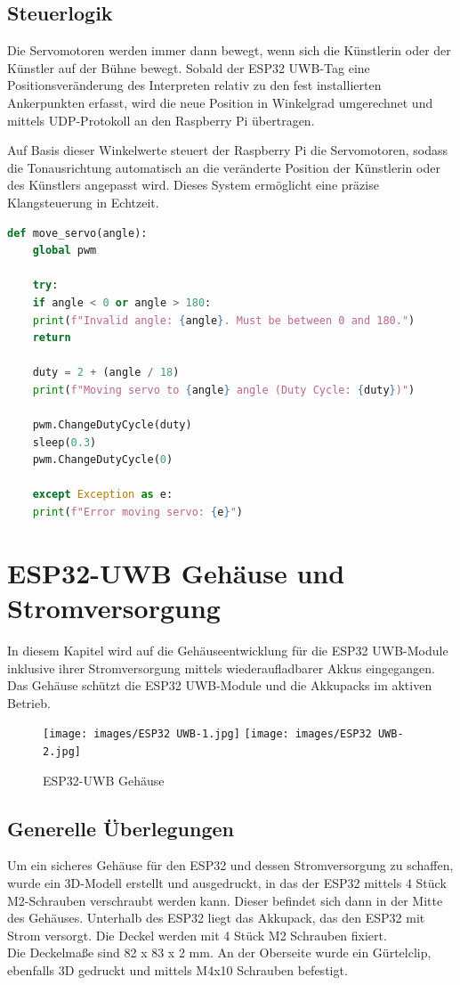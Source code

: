 \newpage
\subsection{Steuerlogik} \label{Steuerlogik}
Die Servomotoren werden immer dann bewegt, wenn sich die Künstlerin oder der Künstler auf der Bühne bewegt. Sobald der ESP32 UWB-Tag eine Positionsveränderung des Interpreten relativ zu den fest installierten Ankerpunkten erfasst, wird die neue Position in Winkelgrad umgerechnet und mittels UDP-Protokoll an den Raspberry Pi übertragen.  

Auf Basis dieser Winkelwerte steuert der Raspberry Pi die Servomotoren, sodass die Tonausrichtung automatisch an die veränderte Position der Künstlerin oder des Künstlers angepasst wird. Dieses System ermöglicht eine präzise Klangsteuerung in Echtzeit.

\begin{lstlisting}[language=Python]
	def move_servo(angle):
	global pwm
	
	try:
	if angle < 0 or angle > 180:
	print(f"Invalid angle: {angle}. Must be between 0 and 180.")
	return
	
	duty = 2 + (angle / 18)
	print(f"Moving servo to {angle} angle (Duty Cycle: {duty})")
	
	pwm.ChangeDutyCycle(duty)
	sleep(0.3)
	pwm.ChangeDutyCycle(0)
	
	except Exception as e:
	print(f"Error moving servo: {e}")
\end{lstlisting}

\newpage
\section{ESP32-UWB Gehäuse und Stromversorgung}
In diesem Kapitel wird auf die Gehäuseentwicklung für die ESP32 UWB-Module inklusive ihrer Stromversorgung mittels wiederaufladbarer Akkus eingegangen. Das Gehäuse schützt die ESP32 UWB-Module und die Akkupacks im aktiven Betrieb.

\begin{figure}[H]
	\centering
	\texttt{[image: images/ESP32 UWB-1.jpg]}
	\texttt{[image: images/ESP32 UWB-2.jpg]}
	\caption[ESP32-UWB Gehäuse]{ESP32-UWB Gehäuse}
	\label{fig:ESP32-UWB Gehäuse V2}
\end{figure}

\subsection{Generelle Überlegungen}
Um ein sicheres Gehäuse für den ESP32 und dessen Stromversorgung zu schaffen, wurde ein 3D-Modell erstellt und ausgedruckt, in das der ESP32 mittels 4 Stück M2-Schrauben verschraubt werden kann. Dieser befindet sich dann in der Mitte des Gehäuses. Unterhalb des ESP32 liegt das Akkupack, das den ESP32 mit Strom versorgt.
Die Deckel werden mit 4 Stück M2 Schrauben fixiert. \\
Die Deckelmaße sind 82 x 83 x 2 mm. An der Oberseite wurde ein Gürtelclip, ebenfalls 3D gedruckt und mittels M4x10 Schrauben befestigt.

